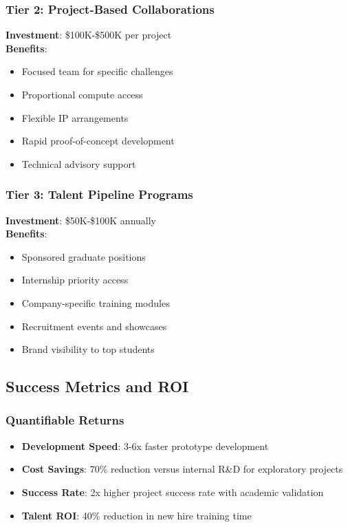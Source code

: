\subsubsection{Tier 2: Project-Based Collaborations}
\textbf{Investment}: \$100K-\$500K per project\\
\textbf{Benefits}:
\begin{itemize}
\item Focused team for specific challenges
\item Proportional compute access
\item Flexible IP arrangements
\item Rapid proof-of-concept development
\item Technical advisory support
\end{itemize}

\subsubsection{Tier 3: Talent Pipeline Programs}
\textbf{Investment}: \$50K-\$100K annually\\
\textbf{Benefits}:
\begin{itemize}
\item Sponsored graduate positions
\item Internship priority access
\item Company-specific training modules
\item Recruitment events and showcases
\item Brand visibility to top students
\end{itemize}

\subsection{Success Metrics and ROI}

\subsubsection{Quantifiable Returns}
\begin{itemize}
\item \textbf{Development Speed}: 3-6x faster prototype development
\item \textbf{Cost Savings}: 70\% reduction versus internal R\&D for exploratory projects
\item \textbf{Success Rate}: 2x higher project success rate with academic validation
\item \textbf{Talent ROI}: 40\% reduction in new hire training time
\end{itemize}

